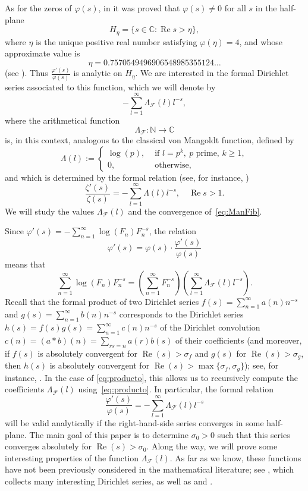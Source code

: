 \documentclass[11pt, a4paper]{article}
\newcommand{\N}{\mathbb{N}}
\newcommand{\C}{\mathbb{C}}
\renewcommand{\Re}{\operatorname{Re}}
\newcommand{\manF}{\Lambda_{\mathcal{F}}}
\theoremstyle{plain}
\theoremstyle{definition}
\begin{document}
As for the zeros of $\varphi(s)$, in \cite[Corollary~7]{Mo} it was proved that $\varphi(s) \neq 0$ for all $s$ in the half-plane 
\[
  H_{\eta} = \{ s\in \C :\Re s>\eta \}, 
\]
where $\eta $ is the unique positive real number satisfying $\varphi(\eta )=4$, and whose approximate value is 
\[
\eta = 0.7570549496906548985355124\dots
\]
(see \cite[Theorem~13]{Mo}). Thus $\frac{\varphi'(s)}{\varphi(s)}$ is analytic on $H_{\eta}$.
We are interested in the formal Dirichlet series associated to this function, which we will denote by
\begin{equation}
\label{eq:ManFib}
  -\sum_{l=1}^{\infty} \manF(l)l^{-s},
\end{equation}
where the arithmetical function
\[
  \manF : \N \rightarrow \C
\]
is, in this context, analogous to the classical von Mangoldt function, defined by 
\[
  \Lambda (l) := 
  \begin{cases}
    \log(p), & \text{ if } l = p^{k}, \ p\text{ prime, }k\geq 1, 
         \\ 
        0, & \text{ otherwise,}
  \end{cases}
\]
and which is determined by the formal relation (see, for instance, \cite[p.~3]{Ivic})
\[
  \frac{\zeta'(s)}{\zeta(s)} = -\sum_{l=1}^{\infty} \Lambda (l)l^{-s},
  \quad \Re s>1. 
\]
We will study the values $\manF(l)$ and the convergence of~\eqref{eq:ManFib}. 

Since $\varphi'(s) = - \sum_{n=1}^\infty \log(F_{n}) F_{n}^{-s}$, the relation
\[
  \varphi'(s) = \varphi(s) \cdot \frac{\varphi'(s)}{\varphi(s)}  
\]
means that
\begin{equation}
\label{eq:producto}
\sum_{n=1}^\infty \log(F_{n}) F_{n}^{-s} 
= \left( \sum_{n=1}^\infty F_{n}^{-s} \right)
\left( \sum_{l=1}^\infty \manF(l)l^{-s} \right).
\end{equation}
Recall that the formal product of two Dirichlet series $f(s) = \sum_{n=1}^\infty a(n)n^{-s}$ and $g(s) = \sum_{n=1}^\infty b(n)n^{-s}$ corresponds to the Dirichlet series $h(s) = f(s)g(s) = \sum_{n=1}^\infty c(n)n^{-s}$ of the Dirichlet convolution  $c(n) = (a*b)(n) = \sum_{rs=n} a(r)b(s)$ of their coefficients (and moreover, if $f(s)$ is absolutely convergent for $\Re(s)>\sigma_f$ and $g(s)$ for $\Re(s)>\sigma_g$, then $h(s)$ is absolutely convergent for $\Re(s) > \max\{\sigma_f, \sigma_g\}$); see, for instance, \cite[Chapter~11]{Ap}. 
In the case of \eqref{eq:producto}, this allows us to recursively compute the coefficients $\manF(l)$ using~\eqref{eq:producto}. In particular, the formal relation
\begin{equation}
\label{eq:ManDir}
\frac{\varphi'(s)}{\varphi(s)} = -\sum_{l=1}^{\infty} \manF(l)l^{-s}
\end{equation}
will be valid analytically if the right-hand-side series converges in some half-plane. 
The main goal of this paper is to determine $\sigma_0>0$ such that this series converges absolutely for $\Re(s)>\sigma_0$. Along the way, we will prove some interesting properties of the function $\manF(l)$. As far as we know, these functions have not been previously considered in the mathematical literature; see \cite{GoSh}, which collects many interesting Dirichlet series, as well as \cite[Chapters 16 and~17]{HaWr} and  \cite[Chapters 1 and~2]{Kno}. 
\end{document}
